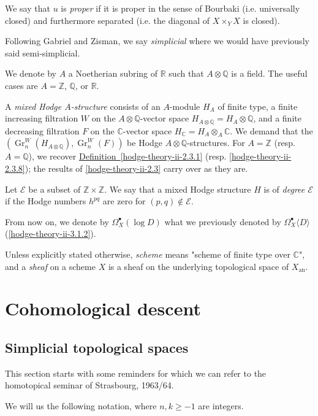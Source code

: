     We say that \(u\) is \emph{proper} if it is proper in the sense of Bourbaki (i.e. universally closed) and furthermore separated (i.e. the diagonal of \(X\times _Y X\) is closed).\label{hodge-theory-iii-0.2}\par{}Following Gabriel and Zisman, we say \emph{simplicial} where we would have previously said semi-simplicial.\label{hodge-theory-iii-0.3}\par{}We denote by \(A\) a Noetherian subring of \(\mathbb {R}\) such that \(A\otimes \mathbb {Q}\) is a field.
    The useful cases are \(A=\mathbb {Z}\), \(\mathbb {Q}\), or \(\mathbb {R}\).\label{hodge-theory-iii-0.4}\par{}A \emph{mixed Hodge \(A\)-structure} consists of an \(A\)-module \(H_A\) of finite type, a finite increasing filtration \(W\) on the \(A\otimes \mathbb {Q}\)-vector space \(H_{A\otimes \mathbb {Q}}=H_A\otimes \mathbb {Q}\), and a finite decreasing filtration \(F\) on the \(\mathbb {C}\)-vector space \(H_\mathbb {C}=H_A\otimes _A\mathbb {C}\).
    We demand that the \((\operatorname {Gr}_n^W(H_{A\otimes \mathbb {Q}}),\operatorname {Gr}_n^W(F))\) be Hodge \(A\otimes \mathbb {Q}\)-structures.
    For \(A=\mathbb {Z}\) (resp. \(A=\mathbb {Q}\)), we recover \hyperref[hodge-theory-ii-2.3.1]{Definition~\ref*{hodge-theory-ii-2.3.1}} (resp. \cref{hodge-theory-ii-2.3.8});
    the results of \cref{hodge-theory-ii-2.3} carry over as they are.\label{hodge-theory-iii-0.5}\par{}Let \(\mathscr {E}\) be a subset of \(\mathbb {Z}\times \mathbb {Z}\).
    We say that a mixed Hodge structure \(H\) is of \emph{degree \(\mathscr {E}\)} if the Hodge numbers \(h^{pq}\) are zero for \((p,q)\not \in \mathscr {E}\).\label{hodge-theory-iii-0.6}\par{}From now on, we denote by \(\Omega _X^\bullet (\log  D)\) what we previously denoted by \(\Omega _X^\bullet \langle  D\rangle \) (\cref{hodge-theory-ii-3.1.2}).\label{hodge-theory-iii-0.7}\par{}Unless explicitly stated otherwise, \emph{scheme} means "scheme of finite type over \(\mathbb {C}\)", and a \emph{sheaf} on a scheme \(X\) is a sheaf on the underlying topological space of \(X_\mathrm {an}\).\chapter{Cohomological descent}\thispagestyle{fancy}\label{hodge-theory-iii-5}\section{Simplicial topological spaces}\label{hodge-theory-iii-5.1}\par{}This section starts with some reminders for which we can refer to the homotopical seminar of Strasbourg, 1963/64.\label{hodge-theory-iii-5.1.1}\par{}We will us the following notation, where \(n,k\geqslant -1\) are integers.

